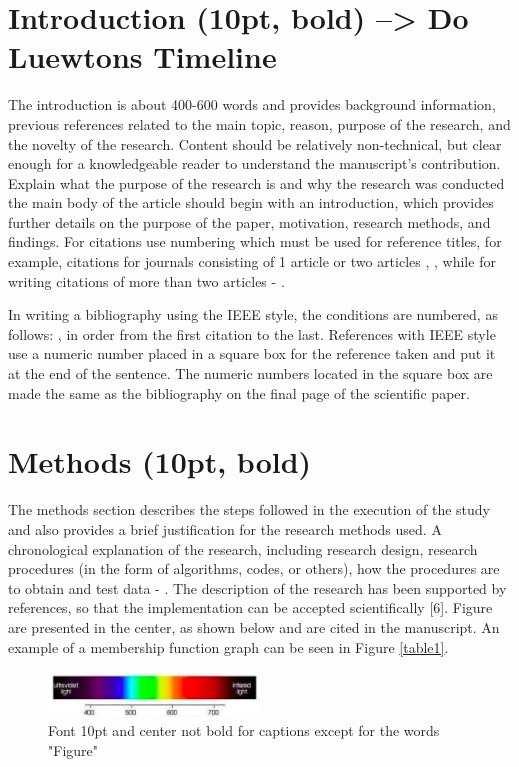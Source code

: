 \documentclass{article}
\begin{document}
\section{Introduction (10pt, bold)  --> Do Luewtons Timeline}
The introduction is about 400-600 words and provides background information, previous references related to the main topic, reason, purpose of the research, and the novelty of the research.  Content should be relatively non-technical, but clear enough for a knowledgeable reader to understand the manuscript’s contribution. Explain what the purpose of the research is and why the research was conducted the main body of the article should begin with an introduction, which provides further details on the purpose of the paper, motivation, research methods, and findings. For citations use numbering which must be used for reference titles, for example, citations for journals consisting of 1 article  \cite{Septiawan1} or two articles \cite{Septiawan2}, \cite{Lucy}, while for writing citations of more than two articles \cite{Gingold} - \cite{Morikawa}.

In writing a bibliography using the IEEE style, the conditions are numbered, as follows: \cite{Septiawan1}, in order from the first citation to the last. References with IEEE style use a numeric number placed in a square box for the reference taken and put it at the end of the sentence. The numeric numbers located in the square box are made the same as the bibliography on the final page of the scientific paper.

\section{Methods (10pt, bold)}
The methods section describes the steps followed in the execution of the study and also provides a brief justification for the research methods used. A chronological explanation of the research, including research design, research procedures (in the form of algorithms, codes, or others), how the procedures are to obtain and test data \cite{Lo} - \cite{Hang}. The description of the research has been supported by references, so that the implementation can be accepted scientifically [6]. Figure are presented in the center, as shown below and are cited in the manuscript. An example of a membership function graph can be seen in Figure \ref{table1}.

\begin{figure}[h]
	\centering
	\includegraphics[width=0.5\textwidth]{images/figur1.PNG}
	\caption{Font 10pt and center not bold for captions except for the words "Figure"}
	\label{fig1}
\end{figure}
\end{document}
